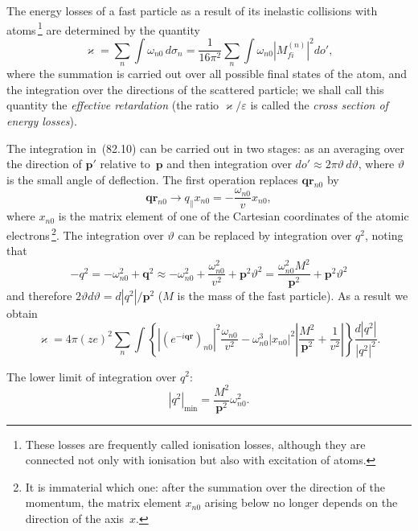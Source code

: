 The energy losses of a fast particle as a result of its inelastic collisions with atoms\,\footnote{These losses are frequently called ionisation losses, although they are connected not only with ionisation but also with excitation of atoms.} are determined by the quantity
\begin{equation}
\varkappa = \sum_n\int\omega_{n0}\,d\sigma_n = \frac{1}{16\pi^2}\sum_n\int\omega_{n0}\left|M_{fi}^{(n)}\right|^2do',
\tag{82.10}
\end{equation}
where the summation is carried out over all possible final states of the atom, and the integration over the directions of the scattered particle; we shall call this quantity the \textit{effective retardation} (the ratio $\varkappa/\varepsilon$ is called the \textit{cross section of energy losses}).

The integration in~(82.10) can be carried out in two stages: as an averaging over the direction of $\mathbf{p}'$ relative to~$\mathbf{p}$ and then integration over $do' \approx 2\pi\vartheta\,d\vartheta$, where $\vartheta$ is the small angle of deflection. The first operation replaces $\mathbf{q}\mathbf{r}_{n0}$ by
\[
\mathbf{q}\mathbf{r}_{n0} \to q_\parallel x_{n0} = -\frac{\omega_{n0}}{v}x_{n0},
\]
where $x_{n0}$ is the matrix element of one of the Cartesian coordinates of the atomic electrons\,\footnote{It is immaterial which one: after the summation over the direction of the momentum, the matrix element $x_{n0}$ arising below no longer depends on the direction of the axis~$x$.}. The integration over $\vartheta$ can be replaced by integration over $q^2$, noting that
\begin{equation}
-q^2 = -\omega_{n0}^2 + \mathbf{q}^2 \approx -\omega_{n0}^2 + \frac{\omega_{n0}^2}{v^2} + \mathbf{p}^2\vartheta^2 = \frac{\omega_{n0}^2 M^2}{\mathbf{p}^2} + \mathbf{p}^2\vartheta^2
\tag{82.11}
\end{equation}
and therefore $2\vartheta d\vartheta = d|q^2|/\mathbf{p}^2$ ($M$ is the mass of the fast particle). As a result we obtain
\begin{equation}
\varkappa = 4\pi(ze)^2\sum_n\int\left\{|(e^{-i\mathbf{qr}})_{n0}|^2\frac{\omega_{n0}}{v^2} - \omega_{n0}^3|x_{n0}|^2\left|\frac{M^2}{\mathbf{p}^2}+\frac{1}{v^2}\right|\right\}\frac{d|q^2|}{|q^2|^2}.
\tag{82.12}
\end{equation}

The lower limit of integration over $q^2$:
\begin{equation}
|q^2|_\text{min} = \frac{M^2}{\mathbf{p}^2}\omega_{n0}^2.
\tag{82.13}
\end{equation}

